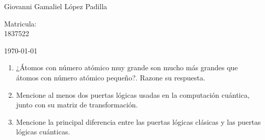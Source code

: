 \documentclass[12pt,letterpaper]{report}
\begin{document}
\begin{titlepage}
\begin{center}
\begin{minipage}{0.6\linewidth}
Giovanni Gamaliel López Padilla
\end{minipage}
\begin{minipage}{0.2\linewidth}
\changefontsizes{14pt} 
Matricula:\\                                                                                                                        
1837522
\end{minipage}
\end{center}
\vspace{4cm}
\begin{flushright}
\today
\end{flushright}
\end{titlepage}
\begin{enumerate}
    \item ¿Átomos con número atómico muy grande son mucho más grandes que átomos con número atómico pequeño?. Razone su respuesta.
    \item Mencione al menos dos puertas lógicas usadas en la computación cuántica, junto con su matriz de transformación.
    \item Mencione la principal diferencia entre las puertas lógicas clásicas y las puertas lógicas cuánticas.
\end{enumerate}
\end{document}
